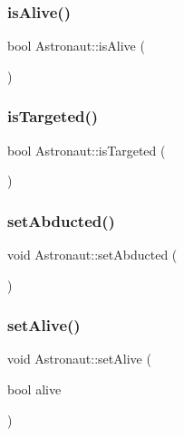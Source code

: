 \mbox{\label{class_astronaut_aeba104cdac7b5d4bf3be18b890dd0b25}} 
\subsubsection{\texorpdfstring{is\+Alive()}{isAlive()}}
{\footnotesize\ttfamily bool Astronaut\+::is\+Alive (\begin{DoxyParamCaption}{ }\end{DoxyParamCaption})}

\mbox{\label{class_astronaut_abf65a970647ce5388dc8488e5fd232d3}} 
\subsubsection{\texorpdfstring{is\+Targeted()}{isTargeted()}}
{\footnotesize\ttfamily bool Astronaut\+::is\+Targeted (\begin{DoxyParamCaption}{ }\end{DoxyParamCaption})}

\mbox{\label{class_astronaut_a08c429446d2b203c6f0386bfd4ce746e}} 
\subsubsection{\texorpdfstring{set\+Abducted()}{setAbducted()}}
{\footnotesize\ttfamily void Astronaut\+::set\+Abducted (\begin{DoxyParamCaption}{ }\end{DoxyParamCaption})}

\mbox{\label{class_astronaut_ac969b5ce6219bb260e0c88a8ec57f459}} 
\subsubsection{\texorpdfstring{set\+Alive()}{setAlive()}}
{\footnotesize\ttfamily void Astronaut\+::set\+Alive (\begin{DoxyParamCaption}\item[{bool}]{alive }\end{DoxyParamCaption})}

